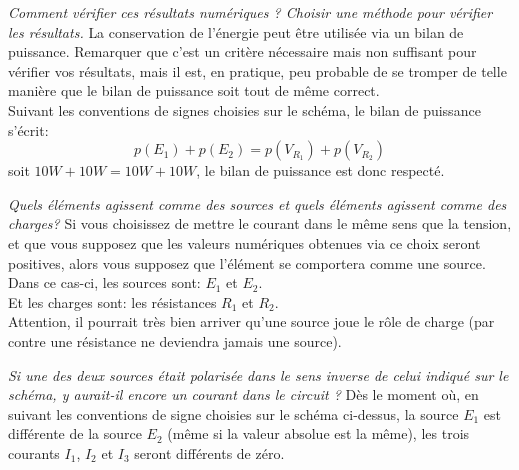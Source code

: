 


{%
\textit{Comment vérifier ces résultats numériques ? Choisir une méthode pour vérifier les résultats.}
}
{%
La conservation de l'énergie peut être utilisée via un bilan de puissance. Remarquer que c'est un critère nécessaire mais non suffisant pour vérifier vos résultats, mais il est, en pratique, peu probable de se tromper de telle manière que le bilan de puissance soit tout de même correct.\\

Suivant les conventions de signes choisies sur le schéma, le bilan de puissance s'écrit:
$$p(E_1)+p(E_2)=p(V_{R_1})+p(V_{R_2})$$
soit $10W+10W=10W+10W$, le bilan de puissance est donc respecté.
}

{%
\textit{Quels éléments agissent comme des sources et quels éléments agissent comme des charges?}
}
{%
Si vous choisissez de mettre le courant dans le même sens que la tension, et que vous supposez que les valeurs numériques obtenues via ce choix seront positives, alors vous supposez que l'élément se comportera comme une source.\\

Dans ce cas-ci, les sources sont: $E_1$ et $E_2$.\\
Et les charges sont: les résistances $R_1$ et $R_2$.\\

Attention, il pourrait très bien arriver qu'une source joue le rôle de charge (par contre une résistance ne deviendra jamais une source).
}

{%
\textit{Si une des deux sources était polarisée dans le sens inverse de celui indiqué sur le schéma, y aurait-il encore un courant dans le circuit ?}
}
{%
Dès le moment où, en suivant les conventions de signe choisies sur le schéma ci-dessus, la source $E_1$ est différente de la source $E_2$ (même si la valeur absolue est la même), les trois courants $I_1$, $I_2$ et $I_3$ seront différents de zéro.
}
\endinput
